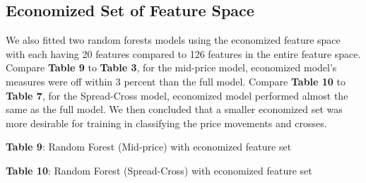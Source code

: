 \documentclass[11pt]{article}
\begin{document}
\subsection{Economized Set of Feature Space}
We also fitted two random forests models using the economized feature space with each having 20 features compared to 126 features in the entire feature space. Compare \textbf{Table 9} to \textbf{Table 3}, for the mid-price model, economized model's measures were off within 3 percent than the full model. Compare \textbf{Table 10} to \textbf{Table 7}, for the Spread-Cross model, economized model performed almost the same as the full model. We then concluded that a smaller economized set was more desirable for training in classifying the price movements and crosses.
\begin{multicols}{2}
\begin{center}
\renewcommand{\arraystretch}{1.4}
\small \textbf{Table 9}: Random Forest (Mid-price) with economized feature set
\end{center}

\begin{center}
\renewcommand{\arraystretch}{1.4}
\small \textbf{Table 10}: Random Forest (Spread-Cross) with economized feature set
\end{center}
\end{multicols}
\end{document}
